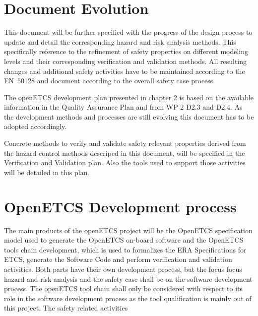 \documentclass{template/openetcs_report}
\begin{document}


\chapter{Document Evolution}

This document will be further specified with the progress of the design process to update and detail the corresponding hazard and risk analysis methods. This specifically reference to the refinement of safety properties on different modeling levels and their corresponding verification and validation methods. All resulting changes and additional safety activities have to be maintained according to the EN~50128 and document according to the overall safety case process. 

The openETCS development plan presented in chapter \ref{sec:development-process} is based on the available information in the Quality Assurance Plan and from WP 2 D2.3 and D2.4. As the development methods and processes are still evolving this document has to be adopted accordingly.

Concrete methods to verify and validate safety relevant properties derived from the hazard control methods descriped in this document, will be specified in the Verification and Validation plan. Also the tools used to support those activities will be detailed in this plan.

\chapter{OpenETCS Development process}
\label{sec:development-process}

The main products of the openETCS project will be the OpenETCS specification model used to generate the OpenETCS on-board software and the OpenETCS tools chain development, which is used to formalizes the ERA Specifications for ETCS, generate the Software Code and perform verification and validation activities. Both parts have their own development process, but the focus focus hazard and risk analysis and the safety case shall be on the software development process. The openETCS tool chain shall only be considered with respect to its role in the software development process as the tool qualification is mainly out of this project.
The safety related activities 
\end{document}
